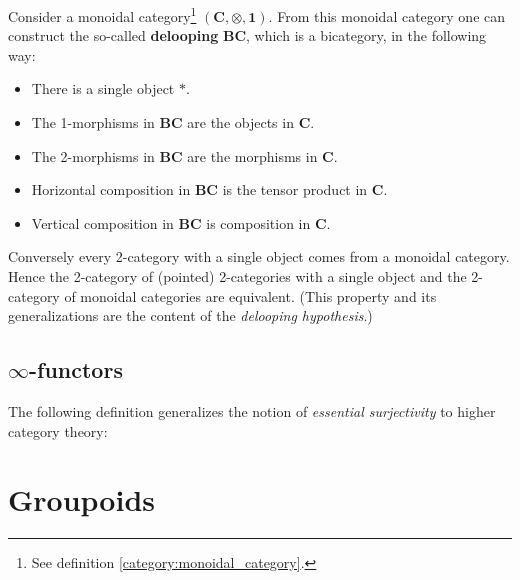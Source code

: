 	
	\begin{property}\label{cat:monoidal_or_2}
		Consider a monoidal category\footnote{See definition \ref{category:monoidal_category}.} $(\textbf{C}, \otimes, \mathbf{1})$. From this monoidal category one can construct the so-called \textbf{delooping} $\mathbf{BC}$, which is a bicategory, in the following way:
		\begin{itemize}
			\item There is a single object $\ast$.
			\item The 1-morphisms in $\mathbf{BC}$ are the objects in $\textbf{C}$.
			\item The 2-morphisms in $\mathbf{BC}$ are the morphisms in $\textbf{C}$.
			\item Horizontal composition in $\mathbf{BC}$ is the tensor product in $\textbf{C}$.
			\item Vertical composition in $\mathbf{BC}$ is composition in $\textbf{C}$.
		\end{itemize}
		Conversely every 2-category with a single object comes from a monoidal category. Hence the 2-category of (pointed) 2-categories with a single object and the 2-category of monoidal categories are equivalent. (This property and its generalizations are the content of the \textit{delooping hypothesis}.)
	\end{property}

\subsection{\texorpdfstring{$\infty$-functors}{Infinity-functors}}

	The following definition generalizes the notion of \textit{essential surjectivity} to higher category theory:

\section{Groupoids}

